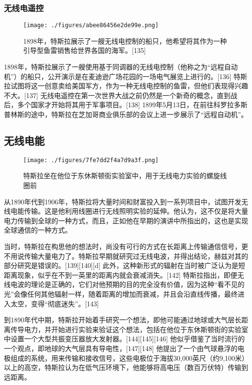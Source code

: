 \subsubsection{无线电遥控}
\begin{figure}[ht]
\centering
\texttt{[image: ./figures/abee86456e2de99e.png]}
\caption{1898年，特斯拉展示了一艘无线电控制的船只，他希望将其作为一种引导型鱼雷销售给世界各国的海军。[135]} \label{fig_Tesla_11}
\end{figure}
1898年，特斯拉展示了一艘使用基于同调器的无线电控制（他称之为“远程自动机”）的船只，公开演示是在麦迪逊广场花园的一场电气展览上进行的。[136] 特斯拉试图将这一创意卖给美国军方，作为一种无线电控制的鱼雷，但他们表现得兴趣不大。[137] 无线电遥控在第一次世界大战之前仍然是一个新奇的概念，直到战后，多个国家才开始将其用于军事项目。[138] 1899年5月13日，在前往科罗拉多斯普林斯的途中，特斯拉在芝加哥商业俱乐部的会议上进一步展示了“远程自动机”。
\subsection{无线电能}
\begin{figure}[ht]
\centering
\texttt{[image: ./figures/7fe7dd2f4a7d9a3f.png]}
\caption{特斯拉坐在他位于东休斯顿街实验室中，用于无线电力实验的螺旋线圈前} \label{fig_Tesla_17}
\end{figure}
从1890年代到1906年，特斯拉将大量时间和财富投入到一系列项目中，试图开发无线电能传输。这是他利用线圈进行无线照明实验的延伸。他认为，这不仅是将大量电力传输到全球的一种方式，而且，正如他在早期的演讲中所指出的，这也是实现全球通信的一种方式。

当时，特斯拉在构思他的想法时，尚没有可行的方式在长距离上传输通信信号，更不用说传输大量电力了。特斯拉早期就研究过无线电波，并得出结论，赫兹对其的部分研究是错误的。[139][140][d] 此外，这种新形式的辐射在当时被广泛认为是短距离现象，似乎在不到一英里的距离内就会衰减消失。[142] 特斯拉指出，即便无线电波的理论是正确的，它们对他预期的目的完全没有价值，因为这种“看不见的光”会像任何其他辐射一样，随着距离的增加而衰减，并且会沿直线传播，最终进入太空，变得“彻底迷失”。[143]

到1890年代中期，特斯拉开始着手研究一个想法，即他可能通过地球或大气层长距离传导电力，并开始进行实验来验证这个想法，包括在他位于东休斯顿街的实验室中设置一个大型共振变压器放大发射器。[144][145][146] 他似乎借鉴了当时流行的一个观点，即地球的大气层具有导电性，[147][148] 他提出了一个由气球悬浮的电极组成的系统，用来传输和接收信号，这些电极位于海拔30,000英尺（约9,100米）以上的高空，特斯拉认为在低气压环境下，他能够将高电压（数百万伏特）传输到远距离。
